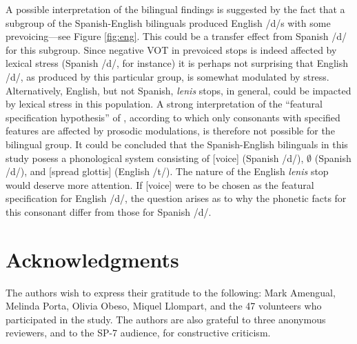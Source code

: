 \documentclass[a4paper]{article}
\begin{document}
A possible interpretation of the bilingual findings is suggested by the fact that a subgroup of the Spanish-English bilinguals produced English /d/s with some prevoicing---see Figure \ref{fig:eng}. This could be a transfer effect from Spanish /d/ for this subgroup. Since negative VOT in prevoiced stops is indeed affected by lexical stress (Spanish /d/, for instance) it is perhaps not surprising that English /d/, as produced by this particular group, is somewhat modulated by stress. Alternatively, English, but not Spanish, \emph{lenis} stops, in general, could be impacted by lexical stress in this population. A strong interpretation of the ``featural specification hypothesis'' of \cite{beckman2011rate}, according to which only consonants with specified features are affected by prosodic modulations, is therefore not possible for the bilingual group. It could be concluded that the Spanish-English bilinguals in this study posess a phonological system consisting of [voice] (Spanish /d/), $\emptyset$ (Spanish /d/), and [spread glottis] (English /t/). The nature of the English \emph{lenis} stop would deserve more attention. If [voice] were to be chosen as the featural specification for English /d/, the question arises as to why the phonetic facts for this consonant differ from those for Spanish /d/.

\section{Acknowledgments}
The authors wish to express their gratitude to the following: Mark Amengual, Melinda Porta, Olivia Obeso, Miquel Llompart, and the 47 volunteers who participated in the study. The authors are also grateful to three anonymous reviewers, and to the SP-7 audience, for constructive criticism.

\newpage
%
\eightpt
 
{}
\end{document}
